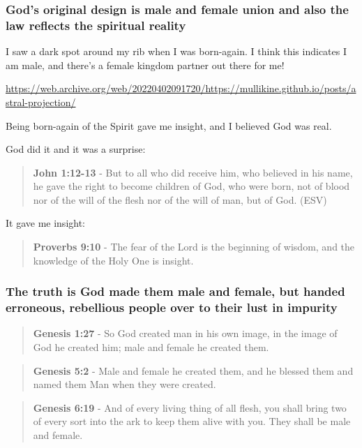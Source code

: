 \documentclass[11pt]{article}
\begin{document}
\subsubsection{God's original design is male and female union and also the law reflects the spiritual reality}
\label{sec:org64c5bc7}

I saw a dark spot around my rib when I was born-again.
I think this indicates I am male, and there's a female kingdom partner out there for me!

\url{https://web.archive.org/web/20220402091720/https://mullikine.github.io/posts/astral-projection/}

Being born-again of the Spirit gave me insight, and I believed God was real.

God did it and it was a surprise:

\begin{quote}
\textbf{John 1:12-13} - But to all who did receive him, who believed in his name, he gave the right to become children of God, who were born, not of blood nor of the will of the flesh nor of the will of man, but of God. (ESV)
\end{quote}

It gave me insight:

\begin{quote}
\textbf{Proverbs 9:10} - The fear of the Lord is the beginning of wisdom, and the knowledge of the Holy One is insight.
\end{quote}

\subsubsection{The truth is God made them male and female, but handed erroneous, rebellious people over to their lust in impurity}
\label{sec:orgcb8b673}
\begin{quote}
\textbf{Genesis 1:27} - So God created man in his own image, in the image of God he created him; male and female he created them.
\end{quote}

\begin{quote}
\textbf{Genesis 5:2} - Male and female he created them, and he blessed them and named them Man when they were created.
\end{quote}

\begin{quote}
\textbf{Genesis 6:19} - And of every living thing of all flesh, you shall bring two of every sort into the ark to keep them alive with you. They shall be male and female.
\end{quote}
\end{document}

